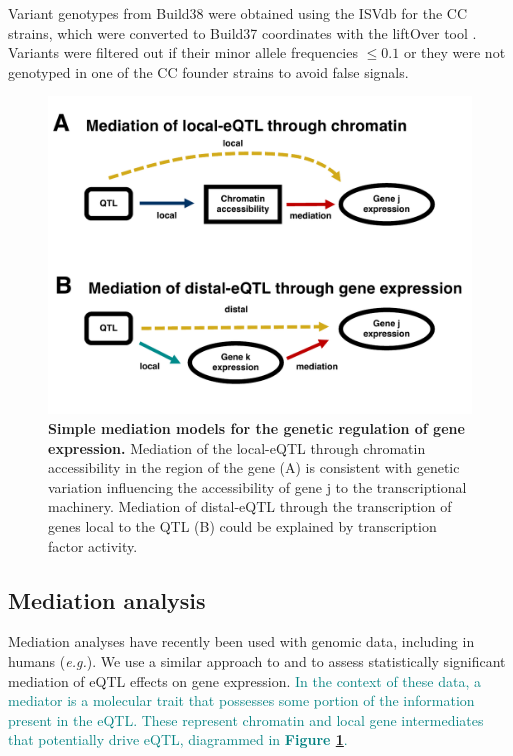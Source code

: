 \documentclass[9pt,twocolumn,twoside]{gsajnl}
\newcommand{\eg}{\emph{e.g.}\xspace}
\newcommand{\GKinline}[1]{\textcolor{teal}{#1}}
\begin{document}
Variant genotypes from Build38 were obtained using the ISVdb \citep{Oreper2017} for the CC strains, which were converted to Build37 coordinates with the liftOver tool \citep{Lawrence2009}. Variants were filtered out if their minor allele frequencies $\le 0.1$ or they were not genotyped in one of the CC founder strains to avoid false signals.

\begin{figure}[htbp]
\renewcommand{\familydefault}{\sfdefault}\normalfont
\centering
\includegraphics[width=\linewidth, clip, trim={0in 0.5in 0in 0in}]{figs/mediation_graph.pdf}
\caption{\textbf{Simple mediation models for the genetic regulation of gene expression.} Mediation of the local-eQTL through chromatin accessibility in the region of the gene (A) is consistent with genetic variation influencing the accessibility of gene j to the transcriptional machinery. Mediation of distal-eQTL through the transcription of genes local to the QTL (B) could be explained by transcription factor activity. 
\label{fig:graph}}
\end{figure}

\subsection{Mediation analysis}

Mediation analyses have recently been used with genomic data, including in humans (\eg \citealt{Battle2014}). We use a similar approach to \cite{Chick2016} and \cite{Keller2018} to assess statistically significant mediation of eQTL effects on gene expression. \GKinline{In the context of these data, a mediator is a molecular trait that possesses some portion of the information present in the eQTL. These represent chromatin and local gene intermediates that potentially drive eQTL, diagrammed in \textbf{Figure \ref{fig:graph}}.}
\end{document}
